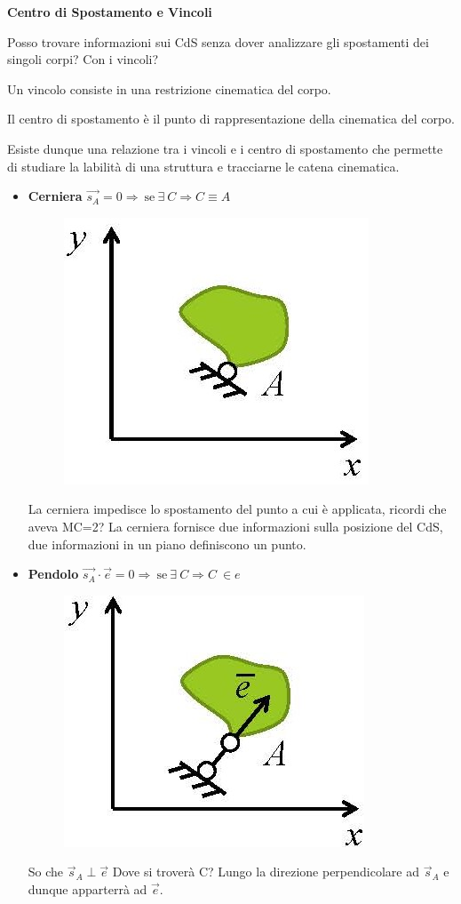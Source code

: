 \documentclass{article}
\begin{document}
\begin{adjustwidth}{2in}{}
\newpage
{\Large \textbf{Centro di Spostamento e Vincoli}} \mbox{} \newline

Posso trovare informazioni sui CdS senza dover analizzare gli spostamenti dei singoli corpi? Con i vincoli?

Un vincolo consiste in una restrizione cinematica del corpo.

Il centro di spostamento è il punto di rappresentazione della cinematica del corpo.

Esiste dunque una relazione tra i vincoli e i centro di spostamento che permette di studiare la labilità di una struttura e tracciarne le catena cinematica. 
\begin{itemize}
\item \textbf{Cerniera} $\vec{s_A} = 0 \Rightarrow ~ \text{se} ~ \exists ~ C \Rightarrow C \equiv A$
\begin{figure}[H]
	\centering
	\includegraphics[width=0.15\linewidth]{immagini/1.PARTE3_Pagina_10 (2)}
\end{figure}
La cerniera impedisce lo spostamento del punto a cui è applicata, ricordi che aveva MC=2? La cerniera fornisce due informazioni sulla posizione del CdS, due informazioni in un piano definiscono un punto. 

\item \textbf{Pendolo} $\vec{s_A} \cdot \vec{e} = 0 \Rightarrow ~ \text{se} ~ \exists ~ C \Rightarrow C ~ \in e$
\begin{figure}[H]
	\centering
	\includegraphics[width=0.15\linewidth]{immagini/1.PARTE3_Pagina_10}
\end{figure}
So che $\vec{s}_A \perp \vec{e}$ Dove si troverà C? Lungo la direzione perpendicolare ad $\vec{s}_A$ e dunque apparterrà ad $\vec{e}$. 


\end{itemize}
\end{adjustwidth}
\end{document}
